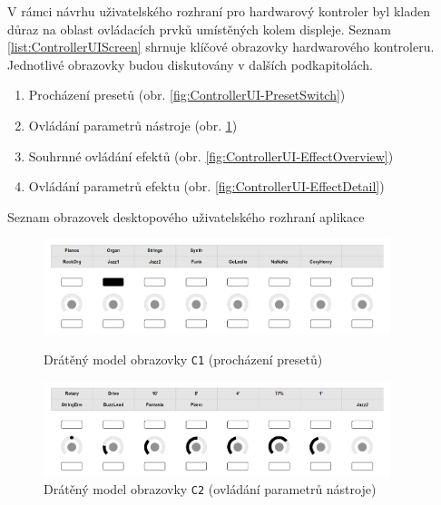 \documentclass[thesis=M,czech]{FITthesis}[2019/03/06]
\begin{document}
	V rámci návrhu uživatelského rozhraní pro hardwarový kontroler byl kladen důraz na oblast ovládacích prvků umístěných kolem displeje.
	Seznam \ref{list:ControllerUIScreen} shrnuje klíčové obrazovky hardwarového kontroleru. Jednotlivé obrazovky budou diskutovány
	v dalších podkapitolách.
	\begin{mylist}
		\begin{enumerate}[label=\textbf{C\arabic*.}]
			\item Procházení presetů (obr. \ref{fig:ControllerUI-PresetSwitch})
			\item Ovládání parametrů nástroje (obr. \ref{fig:ControllerUI-PresetDetail})
			\item Souhrnné ovládání efektů  (obr. \ref{fig:ControllerUI-EffectOverview})
			\item Ovládání parametrů efektu (obr. \ref{fig:ControllerUI-EffectDetail})
		\end{enumerate}
		\caption{Seznam obrazovek desktopového uživatelského rozhraní aplikace}\label{list:ControllerUIScreen}		
	\end{mylist}
	
	\begin{figure}
		\centering
		\includegraphics[width=0.9\textwidth]{ControllerUI-PresetSwitch}
		\caption{Drátěný model obrazovky \texttt{C1} (procházení presetů)}
		\label{fig:ControllerUI-PresetSwitch}			
		\vspace{1.2cm}
		\includegraphics[width=0.9\textwidth]{ControllerUI-PresetDetail}
		\caption{Drátěný model obrazovky \texttt{C2} (ovládání parametrů nástroje)}
		\label{fig:ControllerUI-PresetDetail}
	\end{figure}
	
\end{document}
